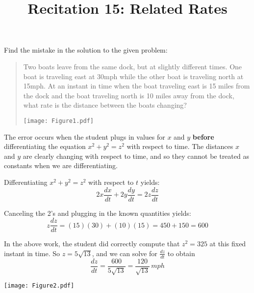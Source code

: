 \documentclass[handout,nooutcomes]{ximera}
\title{Recitation 15: Related Rates}
\newcommand{\dd}[2][]{\frac{d #1}{d #2}}
\newcommand{\dfn}{\textbf}
\renewenvironment{freeResponse}{
\ifhandout\setbox0\vbox\bgroup\else
\begin{trivlist}\item[\hskip \labelsep\bfseries Solution:\hspace{2ex}]
\fi}
{\ifhandout\egroup\else
\end{trivlist}
\fi}
\begin{document}
\begin{abstract}		\end{abstract}
\maketitle

\begin{problem}[warmup]
  Find the mistake in the solution to the given problem:

  \begin{quote}
    Two boats leave from the same dock, but at slightly different
    times.  One boat is traveling east at 30mph while the other boat
    is traveling north at 15mph.  At an instant in time when the boat
    traveling east is 15 miles from the dock and the boat traveling
    north is 10 miles away from the dock, what rate is the distance
    between the boats changing?
    \begin{image}
      \texttt{[image: Figure1.pdf]}
    \end{image}
  \end{quote}
\end{problem}
	
		\begin{freeResponse}
		The error occurs when the student plugs in values for $x$ and $y$ \dfn{before} differentiating the equation $x^2 + y^2 = z^2$ with respect to time.  The distances $x$ and $y$ are clearly changing with respect to time, and so they cannot be treated as constants when we are differentiating.
		
		Differentiating $x^2 + y^2 = z^2$ with respect to $t$ yields:
		$$ 2x \dd[x]{t} + 2y \dd[y]{t} = 2z \dd[z]{t}$$
		
		Canceling the 2's and plugging in the known quantities yields:
		$$ z \dd[z]{t} = (15)(30) + (10)(15) = 450 + 150 = 600 $$
		
		In the above work, the student did correctly compute that $z^2 = 325$ at this fixed instant in time.  So $z = 5\sqrt{13}$, and we can solve for $\dd[z]{t}$ to obtain
		$$ \dd[z]{t} = \frac{600}{5 \sqrt{13}} = \frac{120}{\sqrt{13}} \, mph $$
		\end{freeResponse}	

	\begin{image}
	\texttt{[image: Figure2.pdf]}
	\end{image}
\end{document}
